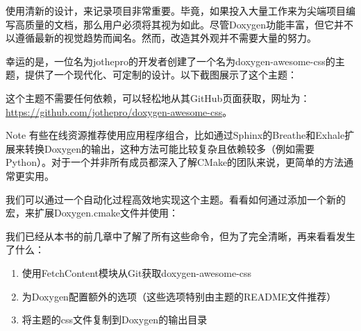 使用清新的设计，来记录项目非常重要。毕竟，如果投入大量工作来为尖端项目编写高质量的文档，那么用户必须将其视为如此。尽管Doxygen功能丰富，但它并不以遵循最新的视觉趋势而闻名。然而，改造其外观并不需要大量的努力。

幸运的是，一位名为jothepro的开发者创建了一个名为doxygen-awesome-css的主题，提供了一个现代化、可定制的设计。以下截图展示了这个主题：


这个主题不需要任何依赖，可以轻松地从其GitHub页面获取，网址为： \url{https://github.com/jothepro/doxygen-awesome-css}。

\begin{myNotic}{Note}
有些在线资源推荐使用应用程序组合，比如通过Sphinx的Breathe和Exhale扩展来转换Doxygen的输出，这种方法可能比较复杂且依赖较多（例如需要Python）。对于一个并非所有成员都深入了解CMake的团队来说，更简单的方法通常更实用。
\end{myNotic}

我们可以通过一个自动化过程高效地实现这个主题。看看如何通过添加一个新的宏，来扩展Doxygen.cmake文件并使用：



我们已经从本书的前几章中了解了所有这些命令，但为了完全清晰，再来看看发生了什么：

\begin{enumerate}
\item
使用FetchContent模块从Git获取doxygen-awesome-css

\item
为Doxygen配置额外的选项（这些选项特别由主题的README文件推荐）

\item
将主题的css文件复制到Doxygen的输出目录
\end{enumerate}

